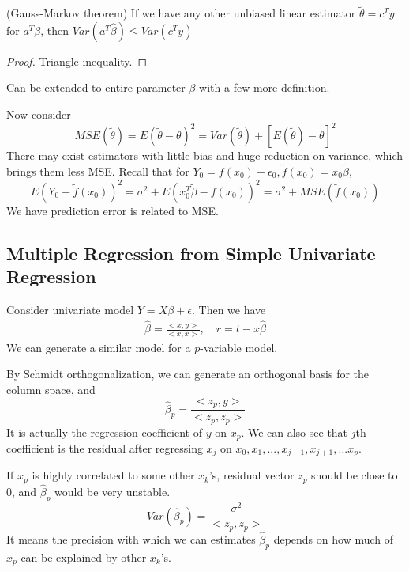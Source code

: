 \begin{thm}
    (Gauss-Markov theorem) If we have any other unbiased linear estimator 
    $\tilde{\theta}=c^Ty$ for $a^T\beta$, then $Var(a^T\hat{\beta})\le Var(c^Ty)$
\end{thm}
\begin{proof}
	Triangle inequality. 
\end{proof}
\begin{rem}
	Can be extended to entire parameter $\beta$ with a few more definition. 
\end{rem}

Now consider 
\begin{equation*}
    MSE(\tilde{\theta})=E(\tilde{\theta}-\theta)^2=
    Var(\tilde{\theta})+[E(\tilde{\theta})-\theta]^2
\end{equation*}
There may exist estimators with little bias and huge reduction on variance, 
which brings them less MSE. Recall that for $Y_0=f(x_0)+\epsilon_0,
\tilde{f}(x_0)=x_0\tilde{\beta}$, 
\begin{equation*}
    E(Y_0-\tilde{f}(x_0))^2=\sigma^2+E(x_0^T\tilde{\beta}-f(x_0))^2
    =\sigma^2+MSE(\tilde{f}(x_0))
\end{equation*}
We have prediction error is related to MSE. 

\subsection{Multiple Regression from Simple Univariate Regression}
Consider univariate model $Y=X\beta+\epsilon$. Then we have
\begin{align*}
\hat{\beta}=\frac{<x,y>}{<x,x>},\quad r=t-x\hat{\beta}
\end{align*}
We can generate a similar model for a $p$-variable model. 

By Schmidt orthogonalization, we can generate an orthogonal basis for the column space, 
and
\begin{equation*}
\hat{\beta}_p=\frac{<z_p,y>}{<z_p,z_p>}
\end{equation*}
It is actually the regression coefficient of $y$ on $x_p$. We can also see that $j$th
coefficient is the residual after regressing $x_j$ on $x_0,x_1,...,x_{j-1},x_{j+1},...x_p$. 

If $x_p$ is highly correlated to some other $x_k$'s, residual vector $z_p$ should be
close to 0, and $\hat{\beta}_p$ would be very unstable. 
\begin{equation*}
Var(\hat{\beta}_p)=\frac{\sigma^2}{<z_p,z_p>}
\end{equation*}
It means the precision with which we can estimates $\hat{\beta}_p$ depends on how much
of $x_p$ can be explained by other $x_k$'s. 

